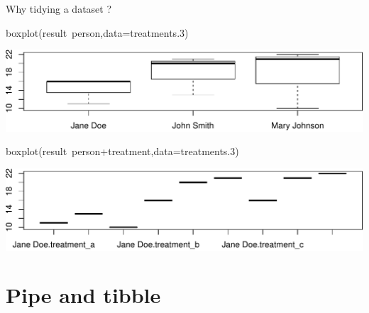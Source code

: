 \documentclass[14pt,ignorenonframetext,]{bredelebeamer}
\newenvironment{Shaded}{\begin{snugshade}}{\end{snugshade}}
\newcommand{\KeywordTok}[1]{\textcolor[rgb]{0.94,0.87,0.69}{#1}}
\newcommand{\DataTypeTok}[1]{\textcolor[rgb]{0.87,0.87,0.75}{#1}}
\newcommand{\DecValTok}[1]{\textcolor[rgb]{0.86,0.86,0.80}{#1}}
\newcommand{\OperatorTok}[1]{\textcolor[rgb]{0.94,0.94,0.82}{#1}}
\newcommand{\NormalTok}[1]{\textcolor[rgb]{0.80,0.80,0.80}{#1}}
\begin{document}
\begin{frame}[fragile]{Why tidying a dataset ?}

\begin{Shaded}
\begin{Highlighting}[]
\KeywordTok{boxplot}\NormalTok{(result}\OperatorTok{~}\NormalTok{person,}\DataTypeTok{data=}\NormalTok{treatments.}\DecValTok{3}\NormalTok{)}
\end{Highlighting}
\end{Shaded}

\includegraphics{tidyverse_28_03_files/figure-beamer/boxplot4-1.pdf}

\begin{Shaded}
\begin{Highlighting}[]
\KeywordTok{boxplot}\NormalTok{(result}\OperatorTok{~}\NormalTok{person}\OperatorTok{+}\NormalTok{treatment,}\DataTypeTok{data=}\NormalTok{treatments.}\DecValTok{3}\NormalTok{)}
\end{Highlighting}
\end{Shaded}

\includegraphics{tidyverse_28_03_files/figure-beamer/boxplot5-1.pdf}

\end{frame}

\section{Pipe and tibble}\label{pipe-and-tibble}
\end{document}
